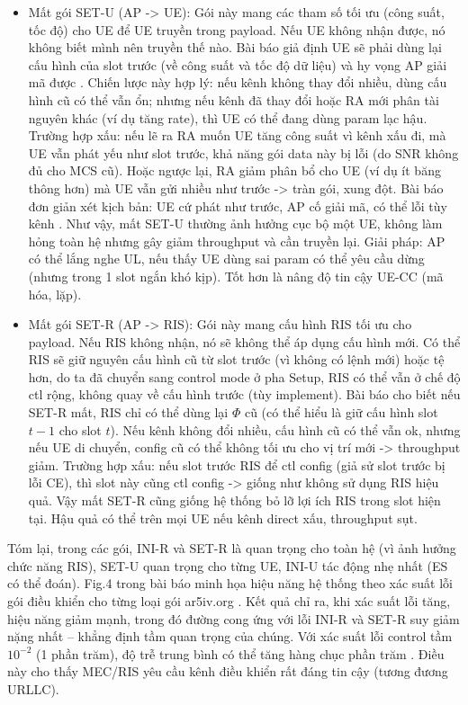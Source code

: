 \begin{itemize}
    \item Mất gói SET-U (AP -> UE): Gói này mang các tham số tối ưu (công suất, tốc độ) cho UE để UE truyền trong payload. Nếu UE không nhận được, nó không biết mình nên truyền thế nào. Bài báo giả định UE sẽ phải dùng lại cấu hình của slot trước (về công suất và tốc độ dữ liệu) và hy vọng AP giải mã được . Chiến lược này hợp lý: nếu kênh không thay đổi nhiều, dùng cấu hình cũ có thể vẫn ổn; nhưng nếu kênh đã thay đổi hoặc RA mới phân tài nguyên khác (ví dụ tăng rate), thì UE có thể đang dùng param lạc hậu. Trường hợp xấu: nếu lẽ ra RA muốn UE tăng công suất vì kênh xấu đi, mà UE vẫn phát yếu như slot trước, khả năng gói data này bị lỗi (do SNR không đủ cho MCS cũ). Hoặc ngược lại, RA giảm phân bổ cho UE (ví dụ ít băng thông hơn) mà UE vẫn gửi nhiều như trước -> tràn gói, xung đột. Bài báo đơn giản xét kịch bản: UE cứ phát như trước, AP cố giải mã, có thể lỗi tùy kênh  . Như vậy, mất SET-U thường ảnh hưởng cục bộ một UE, không làm hỏng toàn hệ nhưng gây giảm throughput và cần truyền lại. Giải pháp: AP có thể lắng nghe UL, nếu thấy UE dùng sai param có thể yêu cầu dừng (nhưng trong 1 slot ngắn khó kịp). Tốt hơn là nâng độ tin cậy UE-CC (mã hóa, lặp).
    \item Mất gói SET-R (AP -> RIS): Gói này mang cấu hình RIS tối ưu cho payload. Nếu RIS không nhận, nó sẽ không thể áp dụng cấu hình mới. Có thể RIS sẽ giữ nguyên cấu hình cũ từ slot trước (vì không có lệnh mới) hoặc tệ hơn, do ta đã chuyển sang control mode ở pha Setup, RIS có thể vẫn ở chế độ ctl rộng, không quay về cấu hình trước (tùy implement). Bài báo cho biết nếu SET-R mất, RIS chỉ có thể dùng lại $\Phi$ cũ (có thể hiểu là giữ cấu hình slot $t-1$ cho slot $t$). Nếu kênh không đổi nhiều, cấu hình cũ có thể vẫn ok, nhưng nếu UE di chuyển, config cũ có thể không tối ưu cho vị trí mới -> throughput giảm. Trường hợp xấu: nếu slot trước RIS để ctl config (giả sử slot trước bị lỗi CE), thì slot này cũng ctl config -> giống như không sử dụng RIS hiệu quả. Vậy mất SET-R cũng giống hệ thống bỏ lỡ lợi ích RIS trong slot hiện tại. Hậu quả có thể trên mọi UE nếu kênh direct xấu, throughput sụt. 
\end{itemize}


Tóm lại, trong các gói, INI-R và SET-R là quan trọng cho toàn hệ (vì ảnh hưởng chức năng RIS), SET-U quan trọng cho từng UE, INI-U tác động nhẹ nhất (ES có thể đoán). Fig.4 trong bài báo minh họa hiệu năng hệ thống theo xác suất lỗi gói điều khiển cho từng loại gói
ar5iv.org
. Kết quả chỉ ra, khi xác suất lỗi tăng, hiệu năng giảm mạnh, trong đó đường cong ứng với lỗi INI-R và SET-R suy giảm nặng nhất – khẳng định tầm quan trọng của chúng. Với xác suất lỗi control tầm $10^{-2}$ (1 phần trăm), độ trễ trung bình có thể tăng hàng chục phần trăm
. Điều này cho thấy MEC/RIS yêu cầu kênh điều khiển rất đáng tin cậy (tương đương URLLC).


